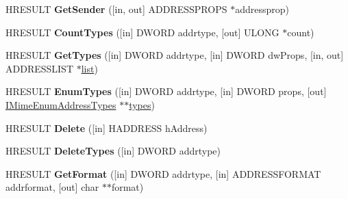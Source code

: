 \begin{DoxyCompactItemize}
H\+R\+E\+S\+U\+LT {\bfseries Get\+Sender} (\mbox{[}in, out\mbox{]} A\+D\+D\+R\+E\+S\+S\+P\+R\+O\+PS $\ast$addressprop)
\item 
\mbox{\label{interface_m_i_m_e_o_l_e_1_1_i_mime_address_table_a15554cbbb57053fa474de3420c28cab6}} 
H\+R\+E\+S\+U\+LT {\bfseries Count\+Types} (\mbox{[}in\mbox{]} D\+W\+O\+RD addrtype, \mbox{[}out\mbox{]} U\+L\+O\+NG $\ast$count)
\item 
\mbox{\label{interface_m_i_m_e_o_l_e_1_1_i_mime_address_table_a0d00ac78a59bd9c9fa4490848dc075a4}} 
H\+R\+E\+S\+U\+LT {\bfseries Get\+Types} (\mbox{[}in\mbox{]} D\+W\+O\+RD addrtype, \mbox{[}in\mbox{]} D\+W\+O\+RD dw\+Props, \mbox{[}in, out\mbox{]} A\+D\+D\+R\+E\+S\+S\+L\+I\+ST $\ast$\hyperlink{classlist}{list})
\item 
\mbox{\label{interface_m_i_m_e_o_l_e_1_1_i_mime_address_table_a43ac3ba1b999d4fa1f89040ec0d00c10}} 
H\+R\+E\+S\+U\+LT {\bfseries Enum\+Types} (\mbox{[}in\mbox{]} D\+W\+O\+RD addrtype, \mbox{[}in\mbox{]} D\+W\+O\+RD props, \mbox{[}out\mbox{]} \hyperlink{interface_m_i_m_e_o_l_e_1_1_i_mime_enum_address_types}{I\+Mime\+Enum\+Address\+Types} $\ast$$\ast$\hyperlink{structtypes}{types})
\item 
\mbox{\label{interface_m_i_m_e_o_l_e_1_1_i_mime_address_table_a775ec31a545c9a6537d5e1cf73ecc745}} 
H\+R\+E\+S\+U\+LT {\bfseries Delete} (\mbox{[}in\mbox{]} H\+A\+D\+D\+R\+E\+SS h\+Address)
\item 
\mbox{\label{interface_m_i_m_e_o_l_e_1_1_i_mime_address_table_a38e62dcb9d4c8bc3e8f635561e93de3c}} 
H\+R\+E\+S\+U\+LT {\bfseries Delete\+Types} (\mbox{[}in\mbox{]} D\+W\+O\+RD addrtype)
\item 
\mbox{\label{interface_m_i_m_e_o_l_e_1_1_i_mime_address_table_a02263bfc501c2a40350f2fc88965472c}} 
H\+R\+E\+S\+U\+LT {\bfseries Get\+Format} (\mbox{[}in\mbox{]} D\+W\+O\+RD addrtype, \mbox{[}in\mbox{]} A\+D\+D\+R\+E\+S\+S\+F\+O\+R\+M\+AT addrformat, \mbox{[}out\mbox{]} char $\ast$$\ast$format)
\item 

\end{DoxyCompactItemize}
